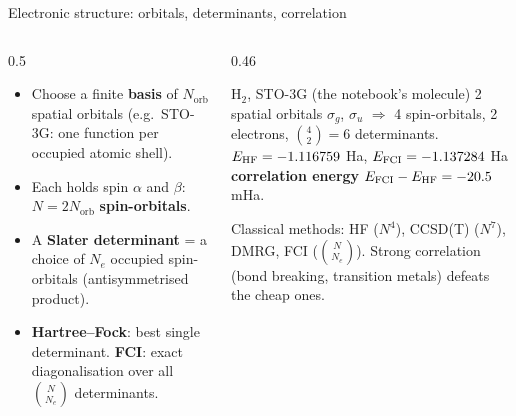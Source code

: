 \documentclass[aspectratio=169,11pt]{beamer}
\newcommand{\key}[1]{{\color{qdark}\textbf{#1}}}
\begin{document}
\begin{frame}{Electronic structure: orbitals, determinants, correlation}
  \begin{columns}[T]
    \begin{column}{0.5\textwidth}
      \begin{itemize}
        \item Choose a finite \key{basis} of $N_{\mathrm{orb}}$ spatial orbitals (e.g.\ STO-3G: one function per occupied atomic shell).
        \item Each holds spin $\alpha$ and $\beta$: $N = 2N_{\mathrm{orb}}$ \key{spin-orbitals}.
        \item A \key{Slater determinant} = a choice of $N_e$ occupied spin-orbitals (antisymmetrised product).
        \item \key{Hartree--Fock}: best single determinant. \key{FCI}: exact diagonalisation over all $\binom{N}{N_e}$ determinants.
      \end{itemize}
    \end{column}
    \begin{column}{0.46\textwidth}
      \begin{exampleblock}{H$_2$, STO-3G (the notebook's molecule)}
        2 spatial orbitals $\sigma_g$, $\sigma_u$ $\Rightarrow$ 4 spin-orbitals, 2 electrons, $\binom42 = 6$ determinants.\\[1mm]
        $E_{\mathrm{HF}} = -1.116759$ Ha, $E_{\mathrm{FCI}} = -1.137284$ Ha\\
        \key{correlation energy} $E_{\mathrm{FCI}} - E_{\mathrm{HF}} = -20.5$ mHa.
      \end{exampleblock}
      \small Classical methods: HF ($N^4$), CCSD(T) ($N^7$), DMRG, FCI ($\binom{N}{N_e}$). Strong correlation (bond breaking, transition metals)
      defeats the cheap ones.
    \end{column}
  \end{columns}
\end{frame}
\end{document}
